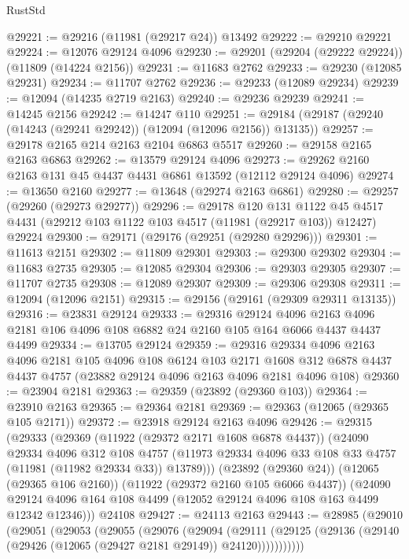 \begin{lexlean}{RustStd}
\begin{coremodule}
@29221 := @29216 (@11981 (@29217 @24)) @13492
@29222 := @29210 @29221
@29224 := @12076 @29124 @4096
@29230 := @29201 (@29204 (@29222 @29224)) (@11809 (@14224 @2156))
@29231 := @11683 @2762
@29233 := @29230 (@12085 @29231)
@29234 := @11707 @2762
@29236 := @29233 (@12089 @29234)
@29239 := @12094 (@14235 @2719 @2163)
@29240 := @29236 @29239
@29241 := @14245 @2156
@29242 := @14247 @110
@29251 := @29184 (@29187 (@29240 (@14243 (@29241 @29242)) (@12094 (@12096 @2156)) @13135))
@29257 := @29178 @2165 @214 @2163 @2104 @6863 @5517
@29260 := @29158 @2165 @2163 @6863
@29262 := @13579 @29124 @4096
@29273 := @29262 @2160 @2163 @131 @45 @4437 @4431 @6861 @13592 (@12112 @29124 @4096)
@29274 := @13650 @2160
@29277 := @13648 (@29274 @2163 @6861)
@29280 := @29257 (@29260 (@29273 @29277))
@29296 := @29178
    @120
    @131
    @1122
    @45
    @4517
    @4431
    (@29212 @103 @1122 @103 @4517 (@11981 (@29217 @103)) @12427)
    @29224
@29300 := @29171 (@29176 (@29251 (@29280 @29296)))
@29301 := @11613 @2151
@29302 := @11809 @29301
@29303 := @29300 @29302
@29304 := @11683 @2735
@29305 := @12085 @29304
@29306 := @29303 @29305
@29307 := @11707 @2735
@29308 := @12089 @29307
@29309 := @29306 @29308
@29311 := @12094 (@12096 @2151)
@29315 := @29156 (@29161 (@29309 @29311 @13135))
@29316 := @23831 @29124
@29333 := @29316
    @29124
    @4096
    @2163
    @4096
    @2181
    @106
    @4096
    @108
    @6882
    @24
    @2160
    @105
    @164
    @6066
    @4437
    @4437
    @4499
@29334 := @13705 @29124
@29359 := @29316
    @29334
    @4096
    @2163
    @4096
    @2181
    @105
    @4096
    @108
    @6124
    @103
    @2171
    @1608
    @312
    @6878
    @4437
    @4437
    @4757
    (@23882 @29124 @4096 @2163 @4096 @2181 @4096 @108)
@29360 := @23904 @2181
@29363 := @29359 (@23892 (@29360 @103))
@29364 := @23910 @2163
@29365 := @29364 @2181
@29369 := @29363 (@12065 (@29365 @105 @2171))
@29372 := @23918 @29124 @2163 @4096
@29426 := @29315
    (@29333
      (@29369
        (@11922 (@29372 @2171 @1608 @6878 @4437))
        (@24090
          @29334
          @4096
          @312
          @108
          @4757
          (@11973 @29334 @4096 @33 @108 @33 @4757 (@11981 (@11982 @29334 @33)) @13789)))
      (@23892 (@29360 @24))
      (@12065 (@29365 @106 @2160))
      (@11922 (@29372 @2160 @105 @6066 @4437))
      (@24090 @29124 @4096 @164 @108 @4499 (@12052 @29124 @4096 @108 @163 @4499 @12342 @12346)))
    @24108
@29427 := @24113 @2163
@29443 := @28985
    (@29010
      (@29051
        (@29053
          (@29055
            (@29076
              (@29094
                (@29111
                  (@29125 (@29136 (@29140 (@29426 (@12065 (@29427 @2181 @29149)) @24120)))))))))))

\end{coremodule}
\end{lexlean}
